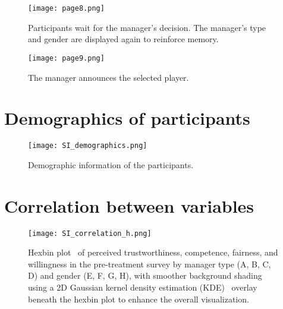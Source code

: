\begin{figure}[htbp] 
    \centering
    \texttt{[image: page8.png]} 
    \caption{Participants wait for the manager's decision. The manager's type and gender are displayed again to reinforce memory.} 
    \label{fig:page8} 
\end{figure} 

\begin{figure}[htbp] 
    \centering
    \texttt{[image: page9.png]} 
    \caption{The manager announces the selected player.} 
    \label{fig:page9} 
\end{figure} 

\clearpage

\section*{Demographics of participants}

\begin{figure}[htbp] 
    \centering
    \texttt{[image: SI\_demographics.png]} 
    \caption{
    Demographic information of the participants.} 
    \label{fig:demographics} 
\end{figure} 

\section*{Correlation between variables}

\begin{figure}[htbp] 
    \centering
    \texttt{[image: SI\_correlation\_h.png]} 
    \caption{
    Hexbin plot~\cite{matplotlib_hexbin} of perceived trustworthiness, competence, fairness, and willingness in the pre-treatment survey by manager type (A, B, C, D) and gender (E, F, G, H), with smoother background shading using a 2D Gaussian kernel density estimation (KDE)~\cite{scipy_gaussian_kde} overlay beneath the hexbin plot to enhance the overall visualization.} 
    \label{fig:correlation} 
\end{figure} 




